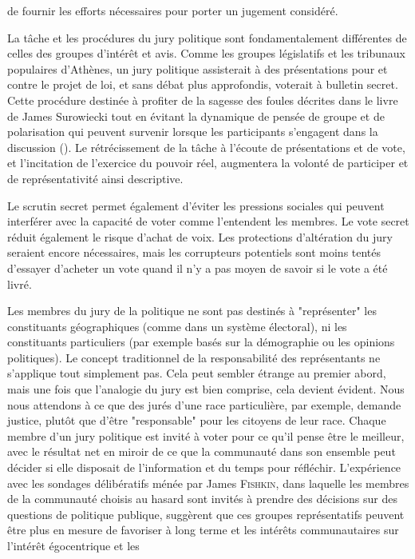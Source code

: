 de fournir les efforts nécessaires pour porter un jugement
considéré.\par
La tâche et les procédures du jury politique sont fondamentalement
différentes de celles des groupes d'intérêt et avis. Comme les groupes
législatifs et les tribunaux populaires d'Athènes, un jury politique
assisterait à des présentations pour et contre le projet de loi, et
sans débat plus approfondis, voterait à bulletin secret. Cette
procédure destinée à profiter de la sagesse des foules décrites dans
le livre de James Surowiecki tout en évitant la dynamique de pensée de
groupe et de polarisation qui peuvent survenir lorsque les
participants s'engagent dans la discussion (\cite{surowiecki04:_wisdom_crowd}). Le
rétrécissement de la tâche à l'écoute de présentations et de vote, et
l'incitation de l'exercice du pouvoir réel, augmentera la volonté de
participer et de représentativité ainsi descriptive.\par
Le scrutin secret permet également d'éviter les pressions sociales qui
peuvent interférer avec la capacité de voter comme l'entendent les
membres. Le vote secret réduit également le risque d'achat de
voix. Les protections d'altération du jury seraient encore
nécessaires, mais les corrupteurs potentiels sont moins tentés
d'essayer d'acheter un vote quand il n'y a pas moyen de savoir si le
vote a été livré.\par
Les membres du jury de la politique ne sont pas destinés à
"représenter" les constituants géographiques (comme dans un système
électoral), ni les constituants particuliers (par exemple basés sur la
démographie ou les opinions politiques). Le concept traditionnel de la
responsabilité des représentants ne s'applique tout simplement
pas. Cela peut sembler étrange au premier abord, mais une fois que
l'analogie du jury est bien comprise, cela devient évident. Nous nous
attendons à ce que des jurés d'une race particulière, par exemple,
demande justice, plutôt que d'être "responsable" pour les citoyens de
leur race. Chaque membre d'un jury politique est invité à voter pour
ce qu'il pense être le meilleur, avec le résultat net en miroir de ce
que la communauté dans son ensemble peut décider si elle disposait
de l'information et du temps pour réfléchir. L'expérience avec les
sondages délibératifs ménée par James \textsc{Fishkin}, dans laquelle les
membres de la communauté choisis au hasard sont invités à prendre des
décisions sur des questions de politique publique, suggèrent que ces
groupes représentatifs peuvent être plus en mesure de favoriser à long
terme et les intérêts communautaires sur l'intérêt égocentrique et les
